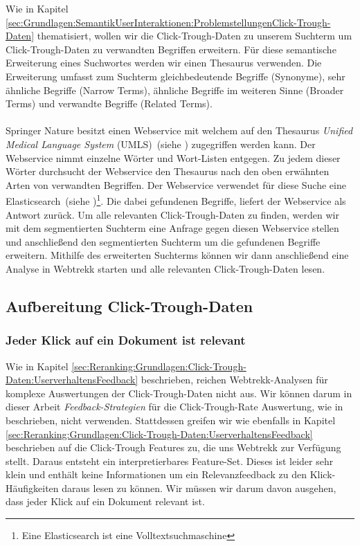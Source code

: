 Wie in Kapitel \ref{sec:Grundlagen:SemantikUserInteraktionen:ProblemstellungenClick-Trough-Daten} thematisiert, wollen wir die Click-Trough-Daten zu unserem Suchterm um Click-Trough-Daten zu verwandten Begriffen erweitern. Für diese semantische Erweiterung eines Suchwortes werden wir einen Thesaurus verwenden. Die Erweiterung umfasst zum Suchterm gleichbedeutende Begriffe (Synonyme), sehr ähnliche Begriffe (Narrow Terms), ähnliche Begriffe im weiteren Sinne (Broader Terms) und verwandte Begriffe (Related Terms).
\\
\\
Springer Nature besitzt einen Webservice mit welchem auf den Thesaurus \textit{Unified Medical Language System} (UMLS)~(siehe \cite{UMLS}) zugegriffen werden kann. Der Webservice nimmt einzelne Wörter und Wort-Listen entgegen. Zu jedem dieser Wörter durchsucht der Webservice den Thesaurus nach den oben erwähnten Arten von verwandten Begriffen. Der Webservice verwendet für diese Suche eine Elasticsearch~(siehe \cite{elasticsearch})\footnote{Eine Elasticsearch ist eine Volltextsuchmaschine}. Die dabei gefundenen Begriffe, liefert der Webservice als Antwort zurück. Um alle relevanten Click-Trough-Daten zu finden, werden wir mit dem segmentierten Suchterm eine Anfrage gegen diesen Webservice stellen und anschließend den segmentierten Suchterm um die gefundenen Begriffe erweitern. Mithilfe des erweiterten Suchterms können wir dann anschließend eine Analyse in Webtrekk starten und alle relevanten Click-Trough-Daten lesen. 

\subsection{Aufbereitung Click-Trough-Daten}
\label{sec:Reranking:Methodik:Click-Trough-Daten}

\subsubsection{Jeder Klick auf ein Dokument ist relevant}
\label{sec:Reranking:Methodik:Click-Trough-Daten:Click-Trough-DatenAuswertungen}

Wie in Kapitel \ref{sec:Reranking:Grundlagen:Click-Trough-Daten:UserverhaltensFeedback} beschrieben, reichen Webtrekk-Analysen für komplexe Auswertungen der Click-Trough-Daten nicht aus. Wir können darum in dieser Arbeit \textit{Feedback-Strategien} für die Click-Trough-Rate Auswertung, wie in \cite{Joachims} beschrieben, nicht verwenden. Stattdessen greifen wir wie ebenfalls in Kapitel \ref{sec:Reranking:Grundlagen:Click-Trough-Daten:UserverhaltensFeedback} beschrieben auf die Click-Trough Features zu, die uns Webtrekk zur Verfügung stellt. Daraus entsteht ein interpretierbares Feature-Set. Dieses ist leider sehr klein und enthält keine Informationen um ein Relevanzfeedback zu den Klick-Häufigkeiten daraus lesen zu können. Wir müssen wir darum davon ausgehen, dass jeder Klick auf ein Dokument relevant ist.

